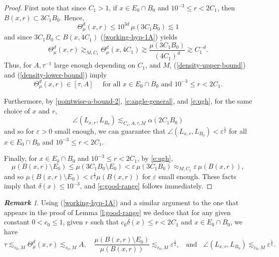 \documentclass[11pt]{amsart}
\newcommand{\R}{{\mathbb R}}       %
\newcommand{\rf}[1]{{(\ref{#1})}}
\newcommand{\ve}{{\varepsilon}}
\theoremstyle{definition}
\theoremstyle{remark}
\newtheorem{rem}[theorem]{\bf Remark}
\numberwithin{equation}{section}
\def\gec{\gtrsim}
\def\lec{\lesssim}
\def\lec{\lesssim}
\def\Lip{\textrm{Lip}}
\begin{document}
\begin{proof}
First note that since $C_1>1$, if $x\in E_{0}\cap B_{0}$ and $10^{-3}\leq r<2C_{1}$, then $B(x,r)\subset 3C_{1}B_{0}$. Hence,
\begin{equation}\label{density-upper-bound}
\Theta^d_{\mu}(x,r)
\leq 10^{3d}\,\mu(3C_{1} B_{0}) \lec 1
\end{equation}
and since $3C_1B_0\subset B(x,4C_1)$ \rf{working-hyp-1A} yields
\begin{equation}\label{density-lower-bound}
\Theta^d_{\mu}(x,r)\gec_{M,C_{1}} \Theta^d_{\mu}(x,4C_{1}) 
\gec \frac{\mu(3C_{1}B_{0})}{(4C_{1})^{d}} \gec C_{1}^{-d}.
\end{equation}
Thus, for $A,\tau^{-1}$ large enough depending on $C_{1}$, and $M$, \rf{density-upper-bound} and \rf{density-lower-bound} imply
\begin{equation}\label{e:ugh}
\Theta^d_{\mu}(x,r)\in [\tau,A]\quad \mbox{ for all } x\in E_{0}\cap B_{0} \mbox{ and }10^{-3}\leq r<2C_{1}.\end{equation}

Furthermore, by \eqref{pointwise-a-bound-2}, \eqref{e:angle-general}, and \eqref{e:ugh}, for the same choice of $x$ and $r$,
\[
\angle(L_{x,r},L_{B_{0}}) \lec_{C_{1},A,\tau,M} \alpha(2C_{1}B_{0}) \]
and so for $\ve>0$ small enough, we can guarantee that $\angle(L_{x,r},L_{B_{0}}) <\ve^{\frac14}$ for all $x\in E_{0}\cap B_0$ and $10^{-3}\leq r<2C_{1}$. 

Finally, for $x\in E_{0}\cap B_{0}$ and $10^{-3}\leq r<2C_{1}$, by \eqref{e:ugh},
\[
\mu(B(x,r)\setminus E_{0})
\leq \mu(3C_{1}B_{0}\setminus E_{0})<\ve\, \mu(3C_{1}B_{0})
\approx_{M,C_{1}} \ve \,\mu(B(x,r)),\]
and so $\mu(B(x,r)\setminus E_{0})<\ve^{\frac{1}{2}}\mu(B(x,r))$ for $\ve$ small enough. These facts imply that $\delta(x)\leq 10^{-3}$, and \eqref{e:good-range} follows immediately.
\end{proof}
%
%


\begin{rem}\label{remark1}
Using \rf{working-hyp-1A} and a similar argument to the one  that appears in the proof of Lemma \ref{l:good-range} we deduce that for any given constant $0<c_0\leq1$, given $r$ such that $ c_0\delta(x)\leq r<2C_{1}$ and $x\in E_{0}\cap B_{0}$, we have
\begin{equation}
\label{e:good-range'}
\tau\lesssim_{c_0,M}\Theta^d_{\mu}(x,r)\lesssim_{c_0,M} A, 
\quad\frac{\mu(B(x,r)\setminus E_{0})}{ \mu(B(x,r))}\lesssim_{c_0,M}\ve^{\frac{1}{2}}, \;
\;\mbox{ and } \;\;  \angle(L_{x,r},L_{B_{0}})\lesssim_{c_0,M} \ve^{\frac14}.
\end{equation}
\end{rem}
\end{document}
